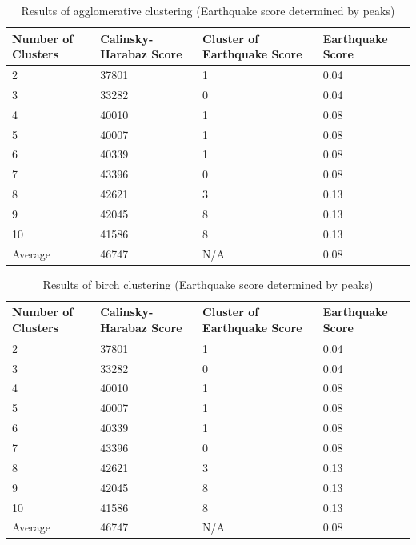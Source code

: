 \documentclass[colorlinks=true,pdfstartview=FitV,linkcolor=blue,
            citecolor=red,urlcolor=magenta]{ligodoc}
\begin{document}
\begin{table}[h!]
\centering
 \begin{tabular}{| m{3.5cm} m{3.5cm} m{3.5cm} m{3.5cm}|} 
 \hline
 Number of Clusters & Calinsky-Harabaz Score & Cluster of Earthquake Score & Earthquake Score\\ [0.5ex] 
 \hline\hline
 2 & 37801 & 1 & 0.04\\ 
 \hline
 3 & 33282 & 0 & 0.04\\
 \hline
 4 & 40010 & 1 & 0.08\\
 \hline
 5 & 40007 & 1 & 0.08\\
 \hline
 6 & 40339 & 1 & 0.08\\ 
 \hline
 7 & 43396 & 0 & 0.08\\
 \hline
 8 & 42621 & 3 & 0.13\\
 \hline
 9 & 42045 & 8 & 0.13\\
 \hline
 10 & 41586 & 8 & 0.13\\
 \hline
 Average & 46747 & N/A & 0.08\\
 \hline
 \end{tabular}
 \caption{Results of agglomerative clustering (Earthquake score determined by peaks)}
 \label{Table 5}
\end{table}

\begin{table}[h!]
\centering
 \begin{tabular}{| m{3.5cm} m{3.5cm} m{3.5cm} m{3.5cm}|} 
 \hline
 Number of Clusters & Calinsky-Harabaz Score & Cluster of Earthquake Score & Earthquake Score\\ [0.5ex] 
 \hline\hline
 2 & 37801 & 1 & 0.04\\ 
 \hline
 3 & 33282 & 0 & 0.04\\
 \hline
 4 & 40010 & 1 & 0.08\\
 \hline
 5 & 40007 & 1 & 0.08\\
 \hline
 6 & 40339 & 1 & 0.08\\ 
 \hline
 7 & 43396 & 0 & 0.08\\
 \hline
 8 & 42621 & 3 & 0.13\\
 \hline
 9 & 42045 & 8 & 0.13\\
 \hline
 10 & 41586 & 8 & 0.13\\
 \hline
 Average & 46747 & N/A & 0.08\\
 \hline
 \end{tabular}
 \caption{Results of birch clustering (Earthquake score determined by peaks)}
 \label{Table 6}
\end{table}
\end{document}
